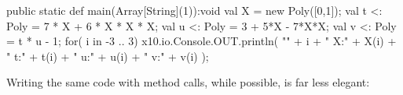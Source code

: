 \begin{xten}
  public static def main(Array[String](1)):void {
     val X = new Poly([0,1]);
     val t <: Poly = 7 * X + 6 * X * X * X; 
     val u <: Poly = 3 + 5*X - 7*X*X;
     val v <: Poly = t * u - 1;
     for( i in -3 .. 3) {
       x10.io.Console.OUT.println(
         "" + i + "	X:" + X(i) + "	t:" + t(i) 
         + "	u:" + u(i) + "	v:" + v(i)
         );
     }
  }

\end{xten}

Writing the same code with method calls, while possible, is far less elegant: 

%
%
%
%
%
%
%
%
